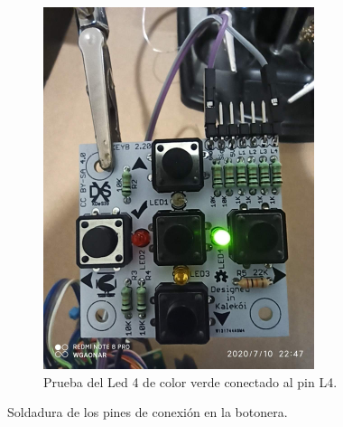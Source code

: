 \documentclass{article}
\begin{document}
\begin{figure}[H]
\begin{subfigure}[t]{0.3\textwidth}
        \includegraphics[width=0.9\columnwidth, height=1.2\columnwidth]{images/Botonera/botonera_ensambleLed_4.png}
        \caption{Prueba del Led 4 de color \textcolor{OliveGreen}{verde} conectado al pin L4.}
        \label{fig:botonera_ensambleLed_4}
    \end{subfigure}
    \caption{Soldadura de los pines de conexión en la botonera.}
    \label{fig:botonera_PruebaLeds}
\end{figure}
\end{document}
